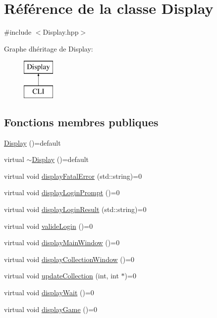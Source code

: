 \hypertarget{classDisplay}{}\section{Référence de la classe Display}
\label{classDisplay}


{\ttfamily \#include $<$Display.\+hpp$>$}

Graphe d\textquotesingle{}héritage de Display\+:\begin{figure}[H]
\begin{center}
\leavevmode
\includegraphics[height=2.000000cm]{classDisplay}
\end{center}
\end{figure}
\subsection*{Fonctions membres publiques}
\begin{DoxyCompactItemize}
\item 
\hyperlink{classDisplay_a46094310ba411f6fea561f799c4d0754}{Display} ()=default
\item 
virtual \hyperlink{classDisplay_a8c364e5ed02f311a695e9502773d1c74}{$\sim$\+Display} ()=default
\item 
virtual void \hyperlink{classDisplay_a9d41e789d52a29d773d7acddd9f01172}{display\+Fatal\+Error} (std\+::string)=0
\item 
virtual void \hyperlink{classDisplay_a55719ab539ee6cc803d9de74b05f8e38}{display\+Login\+Prompt} ()=0
\item 
virtual void \hyperlink{classDisplay_ac4cc71c734feea0099bbeae89e6d2f1c}{display\+Login\+Result} (std\+::string)=0
\item 
virtual void \hyperlink{classDisplay_a93154cf71b945b6ce3ef959a306629f2}{valide\+Login} ()=0
\item 
virtual void \hyperlink{classDisplay_a88a6e0ccafb0ef286149a9ab4ffb28ad}{display\+Main\+Window} ()=0
\item 
virtual void \hyperlink{classDisplay_afb3efa4573ae41c513df30ba4c2691c0}{display\+Collection\+Window} ()=0
\item 
virtual void \hyperlink{classDisplay_a428252a4853e5d700d8a0fa9fe0f21e1}{update\+Collection} (int, int $\ast$)=0
\item 
virtual void \hyperlink{classDisplay_ae3bff36aaa0be0e78b2df88c9b326138}{display\+Wait} ()=0
\item 
virtual void \hyperlink{classDisplay_af3d6e09060fc88351d0c0bf3d349770c}{display\+Game} ()=0
\end{DoxyCompactItemize}


